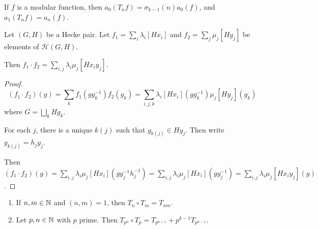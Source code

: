 \documentclass[10pt,a4paper]{article}
\begin{document}
\begin{corollary}
  If $f$ is a modular function, then $a_0(T_n f) = \sigma_{k-1}(n)a_0(f)$, and $a_1(T_n f) = a_n(f)$.
\end{corollary}
\begin{lemma}
  Let $(G,H)$ be a Hecke pair. Let $f_1 = \sum_i \lambda_i [Hx_i]$ and $f_2 = \sum_j \mu_j [Hy_j]$ be elements of $\mathcal{H}(G,H)$.

  Then $f_1\cdot f_2 = \sum_{i,j} \lambda_i \mu_j [Hx_iy_j]$.
\end{lemma}
\begin{proof}
  \[(f_1 \cdot f_2)(g) = \sum_k f_1(gg_k^{-1})f_2(g_k) = \sum_{i,j,k} \lambda_i [Hx_i](gg_k^{-1})\mu_j [Hy_j](g_k)\]
  where $G = \bigsqcup_k Hg_k$.

  For each $j$, there is a unique $k(j)$ such that $g_{k(j)} \in Hy_j$. Then write $g_{k(j)} = h_j y_j$.

  Then $(f_1\cdot f_2)(g) = \sum_{i,j}\lambda_i \mu_j [Hx_i](gy_j^{-1}h_j^{-1}) = \sum_{i,j}\lambda_i \mu_j [Hx_i](gy_j^{-1}) = \sum_{i,j}\lambda_i \mu_j[Hx_iy_j](g)$.
\end{proof}
\begin{proposition}
  \begin{enumerate}
    \item If $n,m \in \mathbb{N}$ and $(n,m) =1$, then $T_n \circ T_m = T_{nm}$.
    \item Let $p, n \in \mathbb{N}$ with $p$ prime. Then $T_{p^n}\circ T_p = T_{p^{n+1}} + p^{k-1}T_{p^{n-1}}$.
  \end{enumerate}
\end{proposition}
\end{document}
